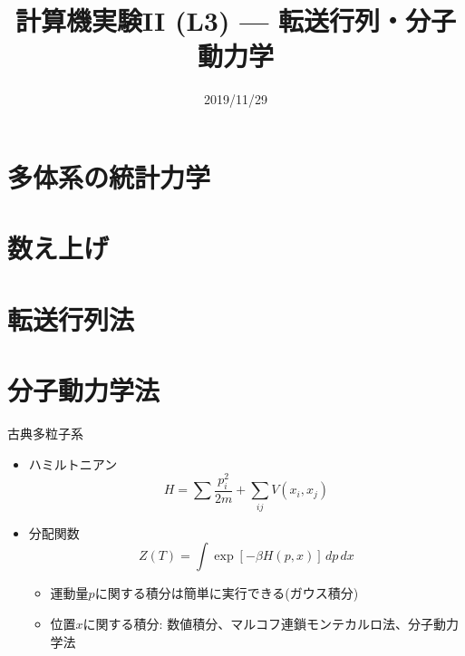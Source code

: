 \documentclass[dvipdfmx]{beamer}
\title{計算機実験II (L3) --- 転送行列・分子動力学}
\date{2019/11/29}
\begin{document}
\begin{frame}
  \titlepage
  \tableofcontents
\end{frame}

\section{多体系の統計力学}






\section{数え上げ}




\section{転送行列法}






% 
% 
% 




\section{分子動力学法}

\begin{frame}[t,fragile]{古典多粒子系}
  \begin{itemize}
    \setlength{\itemsep}{1em}
  \item ハミルトニアン
    \[
    H = \sum \frac{p_i^2}{2m} + \sum_{ij} V(x_i, x_j)
    \]
  \item 分配関数
    \[
    Z(T) = \int \exp [- \beta H(p,x) ] \, dp \, dx
    \]
    \begin{itemize}
    \item 運動量$p$に関する積分は簡単に実行できる(ガウス積分)
    \item 位置$x$に関する積分: 数値積分、マルコフ連鎖モンテカルロ法、分子動力学法
    \end{itemize}
  \end{itemize}
\end{frame}
\end{document}
